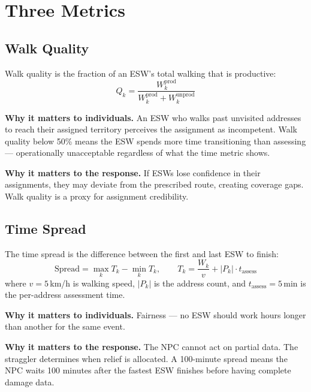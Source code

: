 \documentclass[conference]{IEEEtran}
\begin{document}
\section{Three Metrics}
\label{sec:metrics}

\subsection{Walk Quality}

Walk quality is the fraction of an ESW's total walking that is productive:
\begin{equation}
Q_k = \frac{W_k^{\text{prod}}}{W_k^{\text{prod}} + W_k^{\text{unprod}}}
\label{eq:wq}
\end{equation}

\textbf{Why it matters to individuals.} An ESW who walks past unvisited addresses to reach their assigned territory perceives the assignment as incompetent. Walk quality below 50\% means the ESW spends more time transitioning than assessing --- operationally unacceptable regardless of what the time metric shows.

\textbf{Why it matters to the response.} If ESWs lose confidence in their assignments, they may deviate from the prescribed route, creating coverage gaps. Walk quality is a proxy for assignment credibility.

\subsection{Time Spread}

The time spread is the difference between the first and last ESW to finish:
\begin{equation}
\text{Spread} = \max_k T_k - \min_k T_k, \qquad T_k = \frac{W_k}{v} + |P_k| \cdot t_{\text{assess}}
\label{eq:spread}
\end{equation}
where $v = 5$\,km/h is walking speed, $|P_k|$ is the address count, and $t_{\text{assess}} = 5$\,min is the per-address assessment time.

\textbf{Why it matters to individuals.} Fairness --- no ESW should work hours longer than another for the same event.

\textbf{Why it matters to the response.} The NPC cannot act on partial data. The straggler determines when relief is allocated. A 100-minute spread means the NPC waits 100 minutes after the fastest ESW finishes before having complete damage data.
\end{document}
